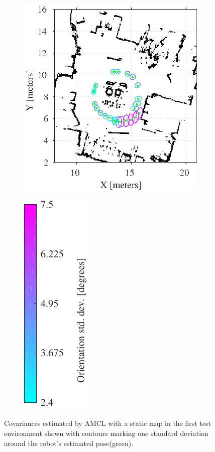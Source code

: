 \begin{figure}[htbp]
	\centering
	\begin{subfigure}[t]{0.55\textwidth}
		\includegraphics[scale=1.0]{chapters/evaluation/figures/localization_static_map1}		
	\end{subfigure}
	\begin{subfigure}[t]{0.2\textwidth}
		\includegraphics[scale=1.0]{chapters/evaluation/figures/localization_std_color_bar-crop}
	\end{subfigure}
	\caption{Covariances estimated by AMCL with a static map in the first test environment shown with contours marking one standard deviation around the robot's estimated pose(green).}
    \label{fig:amcl_covariance_static1}
\end{figure}

